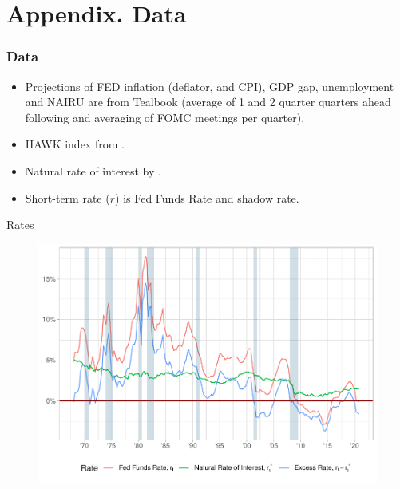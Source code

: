 \documentclass[10pt,aspectratio=169]{beamer}
\begin{document}
\lastslide





\appendix
\section{Appendix. Data}

\begin{frame}[label=backupSlide]\frametitle{Data}
    \begin{itemize}\setlength\itemsep{1em}
        \item Projections of FED inflation (deflator, and CPI), GDP gap, unemployment and NAIRU are from Tealbook {\color{gray}
        (average of 1 and 2 quarter quarters ahead following \cite{CoibionGorodnichenko2011} and averaging of FOMC meetings per quarter).}
        \item HAWK index from \cite{HIM2023}.
        \item Natural rate of interest by \cite{HLW2017,HLW2023}.
        \item Short-term rate ($r$) is Fed Funds Rate and \cite{WuXia2016} shadow rate.
        \end{itemize}
    \end{frame}

    \begin{frame}{Rates}
        \begin{figure}[h!]\centering 
            \begin{minipage}{0.7\textwidth}\centering
                \includegraphics[width=\textwidth]{rate_plot.pdf}
            \end{minipage}
        \end{figure}
    \end{frame}
\end{document}
